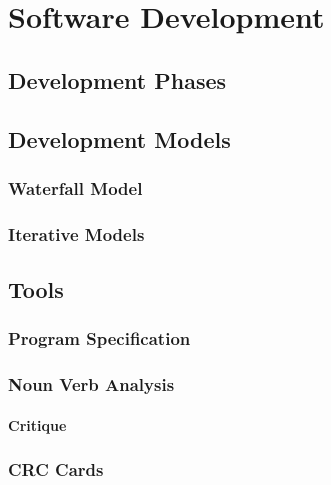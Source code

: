 \chapter{Software Development}

\section{Development Phases}

\section{Development Models}
\subsection{Waterfall Model}
\subsection{Iterative Models}

\section{Tools}
\subsection{Program Specification}
\subsection{Noun Verb Analysis}
\subsubsection{Critique}
\subsection{CRC Cards}

